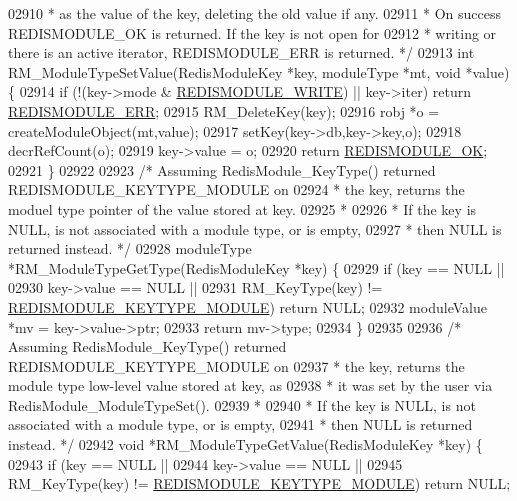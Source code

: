 \begin{DoxyCode}
{{{02910 \textcolor{comment}{ * as the value of the key, deleting the old value if any.}
02911 \textcolor{comment}{ * On success REDISMODULE\_OK is returned. If the key is not open for}
02912 \textcolor{comment}{ * writing or there is an active iterator, REDISMODULE\_ERR is returned. */}
02913 \textcolor{keywordtype}{int} RM\_ModuleTypeSetValue(RedisModuleKey *key, moduleType *mt, \textcolor{keywordtype}{void} *value) \{
02914     \textcolor{keywordflow}{if} (!(key->mode & \hyperlink{redismodule_8h_a73b37117ef94cb4a904361afcc51b6b4}{REDISMODULE\_WRITE}) || key->iter) \textcolor{keywordflow}{return} 
      \hyperlink{redismodule_8h_a3df6f5bd5247289e66f44437a7cddd49}{REDISMODULE\_ERR};
02915     RM\_DeleteKey(key);
02916     robj *o = createModuleObject(mt,value);
02917     setKey(key->db,key->key,o);
02918     decrRefCount(o);
02919     key->value = o;
02920     \textcolor{keywordflow}{return} \hyperlink{redismodule_8h_a1bc5bfd69abcd378ff52c640adc5418d}{REDISMODULE\_OK};
02921 \}
02922 
02923 \textcolor{comment}{/* Assuming RedisModule\_KeyType() returned REDISMODULE\_KEYTYPE\_MODULE on}
02924 \textcolor{comment}{ * the key, returns the moduel type pointer of the value stored at key.}
02925 \textcolor{comment}{ *}
02926 \textcolor{comment}{ * If the key is NULL, is not associated with a module type, or is empty,}
02927 \textcolor{comment}{ * then NULL is returned instead. */}
02928 moduleType *RM\_ModuleTypeGetType(RedisModuleKey *key) \{
02929     \textcolor{keywordflow}{if} (key == NULL ||
02930         key->value == NULL ||
02931         RM\_KeyType(key) != \hyperlink{redismodule_8h_a7beeb7b9c1c8e419591b3affb5b01f93}{REDISMODULE\_KEYTYPE\_MODULE}) \textcolor{keywordflow}{return} NULL;
02932     moduleValue *mv = key->value->ptr;
02933     \textcolor{keywordflow}{return} mv->type;
02934 \}
02935 
02936 \textcolor{comment}{/* Assuming RedisModule\_KeyType() returned REDISMODULE\_KEYTYPE\_MODULE on}
02937 \textcolor{comment}{ * the key, returns the module type low-level value stored at key, as}
02938 \textcolor{comment}{ * it was set by the user via RedisModule\_ModuleTypeSet().}
02939 \textcolor{comment}{ *}
02940 \textcolor{comment}{ * If the key is NULL, is not associated with a module type, or is empty,}
02941 \textcolor{comment}{ * then NULL is returned instead. */}
02942 \textcolor{keywordtype}{void} *RM\_ModuleTypeGetValue(RedisModuleKey *key) \{
02943     \textcolor{keywordflow}{if} (key == NULL ||
02944         key->value == NULL ||
02945         RM\_KeyType(key) != \hyperlink{redismodule_8h_a7beeb7b9c1c8e419591b3affb5b01f93}{REDISMODULE\_KEYTYPE\_MODULE}) \textcolor{keywordflow}{return} NULL;
}}}
\end{DoxyCode}
